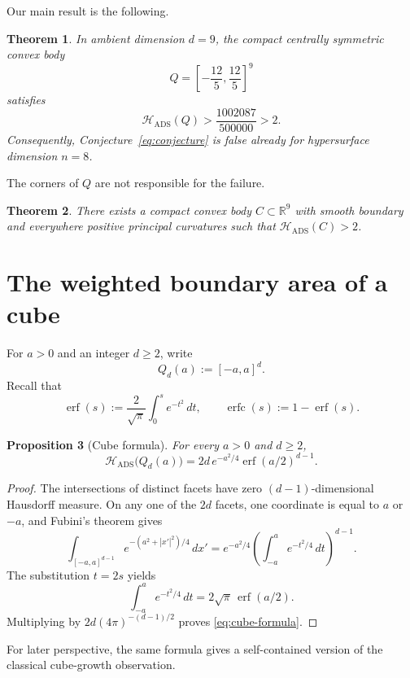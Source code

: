 \documentclass[11pt,reqno]{amsart}
\newtheorem{theorem}{Theorem}[section]
\newtheorem{proposition}[theorem]{Proposition}
\theoremstyle{remark}
\DeclareMathOperator{\erf}{erf}
\DeclareMathOperator{\erfc}{erfc}
\newcommand{\R}{\mathbb{R}}
\newcommand{\Hads}{\mathcal{H}_{\mathrm{ADS}}}
\begin{document}
Our main result is the following.

\begin{theorem}\label{thm:main}
In ambient dimension \(d=9\), the compact centrally symmetric convex body
\[
 Q=\left[-\frac{12}{5},\frac{12}{5}\right]^9
\]
satisfies
\begin{equation}\label{eq:main-bound}
 \Hads(Q)>\frac{1002087}{500000}>2.
\end{equation}
Consequently, Conjecture~\eqref{eq:conjecture} is false already for
hypersurface dimension \(n=8\).
\end{theorem}

The corners of \(Q\) are not responsible for the failure.

\begin{theorem}\label{thm:smooth}
There exists a compact convex body \(C\subset\R^9\) with smooth boundary
and everywhere positive principal curvatures such that
\(\Hads(C)>2\).
\end{theorem}

\section{The weighted boundary area of a cube}

For \(a>0\) and an integer \(d\ge2\), write
\[
 Q_d(a):=[-a,a]^d.
\]
Recall that
\[
 \erf(s):=\frac{2}{\sqrt\pi}\int_0^s e^{-t^2}\,dt,
 \qquad
 \erfc(s):=1-\erf(s).
\]

\begin{proposition}[Cube formula]\label{prop:cube-formula}
For every \(a>0\) and \(d\ge2\),
\begin{equation}\label{eq:cube-formula}
 \Hads\bigl(Q_d(a)\bigr)
 =2d\,e^{-a^2/4}\erf(a/2)^{d-1}.
\end{equation}
\end{proposition}

\begin{proof}
The intersections of distinct facets have zero \((d-1)\)-dimensional
Hausdorff measure.  On any one of the \(2d\) facets, one coordinate is
equal to \(a\) or \(-a\), and Fubini's theorem gives
\[
 \int_{[-a,a]^{d-1}}e^{-(a^2+|x'|^2)/4}\,dx'
 =e^{-a^2/4}
   \left(\int_{-a}^{a}e^{-t^2/4}\,dt\right)^{d-1}.
\]
The substitution \(t=2s\) yields
\[
 \int_{-a}^{a}e^{-t^2/4}\,dt
 =2\sqrt\pi\,\erf(a/2).
\]
Multiplying by \(2d(4\pi)^{-(d-1)/2}\) proves
\eqref{eq:cube-formula}.
\end{proof}

For later perspective, the same formula gives a self-contained version of
the classical cube-growth observation.
\end{document}
